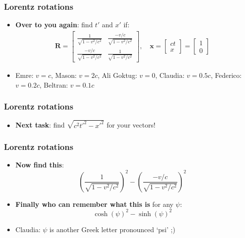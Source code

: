 \documentclass{beamer}
\begin{document}
\begin{frame}
  \frametitle{Lorentz rotations}
  \begin{itemize}
    \item<1-> \textbf{Over to you again}: find $t'$ and $x'$ if:
      \begin{align*}
	\mathbf{R}=
	\begin{bmatrix}
	  \frac{1}{\sqrt{1-v^2/c^2}} & \frac{-v/c}{\sqrt{1-v^2/c^2}}\\
	  \frac{-v/c}{\sqrt{1-v^2/c^2}} & \frac{1}{\sqrt{1-v^2/c^2}}
	\end{bmatrix}
	, \quad
	\mathbf{x}=
	\begin{bmatrix}
	  ct\\
	  x
	\end{bmatrix}
	=
	\begin{bmatrix}
	  1\\
	  0
	\end{bmatrix}
      \end{align*}
    \item<2-> Emre: $v=c$, Mason: $v=2c$, Ali Goktug: $v=0$, Claudia: $v=0.5c$, Federico: $v=0.2c$, Beltran: $v=0.1c$
  \end{itemize}
\end{frame}

\begin{frame}
  \frametitle{Lorentz rotations}
  \begin{itemize}
    \item<1-> \textbf{Next task}: find $\sqrt{c^2t'^2-x'^2}$ for your vectors!
  \end{itemize}
\end{frame}

\begin{frame}
  \frametitle{Lorentz rotations}
  \begin{itemize}
    \item<1-> \textbf{Now find this}:
      \begin{equation*}
	\left( \frac{1}{\sqrt{1-v^2/c^2}} \right)^2-\left( \frac{-v/c}{\sqrt{1-v^2/c^2}} \right)^2
      \end{equation*}
    \item<2-> \textbf{Finally who can remember what this is} for any $\psi$:
      \begin{equation*}
	\cosh(\psi)^2-\sinh(\psi)^2
      \end{equation*}
    \item<3-> Claudia: $\psi$ is another Greek letter pronounced `psi' ;) 
  \end{itemize}
\end{frame}
\end{document}
